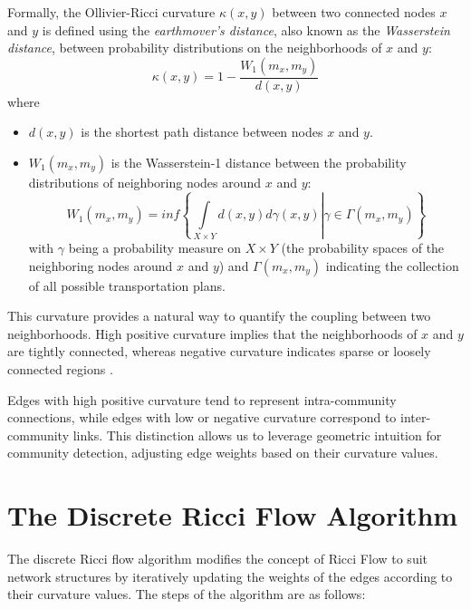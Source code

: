Formally, the Ollivier-Ricci curvature $\kappa(x, y)$ between two connected nodes $x$ and $y$ is defined using the \textit{earthmover's distance}, also known as the \textit{Wasserstein distance}, between probability distributions on the neighborhoods of $x$ and $y$:
\begin{equation}\label{eq3}
    \kappa(x, y) = 1 - \frac{W_1(m_x, m_y)}{d(x, y)}
\end{equation}
where
\begin{itemize}
    \item $d(x, y)$ is the shortest path distance between nodes $x$ and $y$.
    \item $W_1(m_x, m_y)$ is the Wasserstein-1 distance between the probability distributions of neighboring nodes around $x$ and $y$:
    \begin{equation}
        W_1(m_x, m_y) = \textit{inf} \left\{ \left. \int\limits_{X \times Y} d(x,y) d\gamma(x,y) \right| \gamma \in \Gamma(m_x, m_y)  \right\}
    \end{equation}
    with $\gamma$ being a probability measure on $X \times Y$ (the probability spaces of the neighboring nodes around $x$ and $y$) and $\Gamma(m_x, m_y)$ indicating the collection of all possible transportation plans.
\end{itemize}

This curvature provides a natural way to quantify the coupling between two neighborhoods. High positive curvature implies that the neighborhoods of $x$ and $y$ are tightly connected, whereas negative curvature indicates sparse or loosely connected regions \cite{communitydetectionnetworksricci}.

Edges with high positive curvature tend to represent intra-community connections, while edges with low or negative curvature correspond to inter-community links. This distinction allows us to leverage geometric intuition for community detection, adjusting edge weights based on their curvature values.




\section{The Discrete Ricci Flow Algorithm}
The discrete Ricci flow algorithm modifies the concept of Ricci Flow to suit network structures by iteratively updating the weights of the edges according to their curvature values. The steps of the algorithm are as follows:

